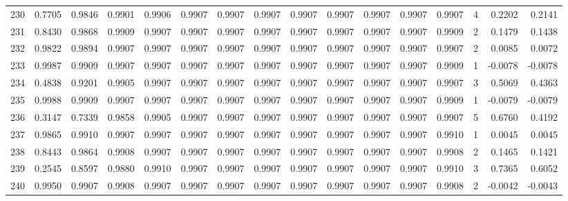 \begin{tabular}{lrrrrrrrrrrrrrrr}
230 &      0.7705 &  0.9846 &  0.9901 &  0.9906 &  0.9907 &  0.9907 &  0.9907 &  0.9907 &  0.9907 &  0.9907 &   0.9907 &     0.9907 &      4 &                    0.2202 &                     0.2141 \\
231 &      0.8430 &  0.9868 &  0.9909 &  0.9907 &  0.9907 &  0.9907 &  0.9907 &  0.9907 &  0.9907 &  0.9907 &   0.9907 &     0.9909 &      2 &                    0.1479 &                     0.1438 \\
232 &      0.9822 &  0.9894 &  0.9907 &  0.9907 &  0.9907 &  0.9907 &  0.9907 &  0.9907 &  0.9907 &  0.9907 &   0.9907 &     0.9907 &      2 &                    0.0085 &                     0.0072 \\
233 &      0.9987 &  0.9909 &  0.9907 &  0.9907 &  0.9907 &  0.9907 &  0.9907 &  0.9907 &  0.9907 &  0.9907 &   0.9907 &     0.9909 &      1 &                   -0.0078 &                    -0.0078 \\
234 &      0.4838 &  0.9201 &  0.9905 &  0.9907 &  0.9907 &  0.9907 &  0.9907 &  0.9907 &  0.9907 &  0.9907 &   0.9907 &     0.9907 &      3 &                    0.5069 &                     0.4363 \\
235 &      0.9988 &  0.9909 &  0.9907 &  0.9907 &  0.9907 &  0.9907 &  0.9907 &  0.9907 &  0.9907 &  0.9907 &   0.9907 &     0.9909 &      1 &                   -0.0079 &                    -0.0079 \\
236 &      0.3147 &  0.7339 &  0.9858 &  0.9905 &  0.9907 &  0.9907 &  0.9907 &  0.9907 &  0.9907 &  0.9907 &   0.9907 &     0.9907 &      5 &                    0.6760 &                     0.4192 \\
237 &      0.9865 &  0.9910 &  0.9907 &  0.9907 &  0.9907 &  0.9907 &  0.9907 &  0.9907 &  0.9907 &  0.9907 &   0.9907 &     0.9910 &      1 &                    0.0045 &                     0.0045 \\
238 &      0.8443 &  0.9864 &  0.9908 &  0.9907 &  0.9907 &  0.9907 &  0.9907 &  0.9907 &  0.9907 &  0.9907 &   0.9907 &     0.9908 &      2 &                    0.1465 &                     0.1421 \\
239 &      0.2545 &  0.8597 &  0.9880 &  0.9910 &  0.9907 &  0.9907 &  0.9907 &  0.9907 &  0.9907 &  0.9907 &   0.9907 &     0.9910 &      3 &                    0.7365 &                     0.6052 \\
240 &      0.9950 &  0.9907 &  0.9908 &  0.9907 &  0.9907 &  0.9907 &  0.9907 &  0.9907 &  0.9907 &  0.9907 &   0.9907 &     0.9908 &      2 &                   -0.0042 &                    -0.0043 \\

\end{tabular}
